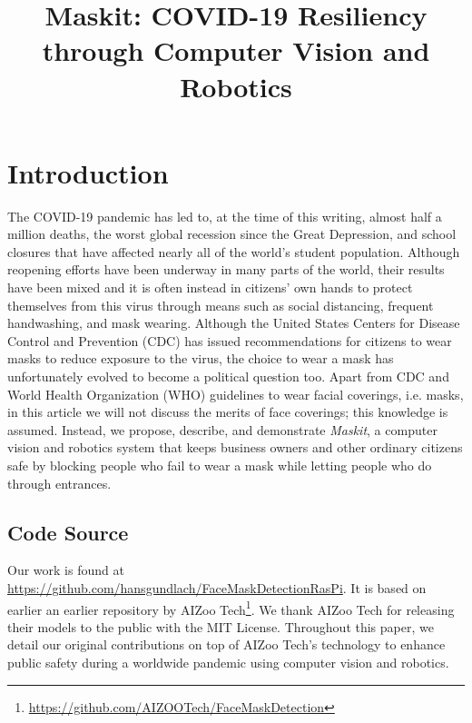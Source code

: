 \documentclass[conference, 12pt, onecolumn]{IEEEtran}
\date{}
\begin{document}
\title{Maskit: COVID-19 Resiliency through Computer Vision and Robotics}
\author{ 
\and
{}
}

\maketitle
\tableofcontents
\newpage

\section{Introduction}
The COVID-19 pandemic has led to, at the time of this writing, almost half a million deaths, the worst global recession since the Great Depression, and school closures that have affected nearly all of the world's student population. Although reopening efforts have been underway in many parts of the world, their results have been mixed and it is often instead in citizens' own hands to protect themselves from this virus through means such as social distancing, frequent handwashing, and mask wearing. Although the United States Centers for Disease Control and Prevention (CDC) has issued recommendations for citizens to wear masks to reduce exposure to the virus, the choice to wear a mask has unfortunately evolved to become a political question too\cite{brandon_2020, vigdor_2020}. Apart from CDC and World Health Organization (WHO) guidelines to wear facial coverings, i.e. masks, in this article we will not discuss the merits of face coverings; this knowledge is assumed. Instead, we propose, describe, and demonstrate \textit{Maskit}, a computer vision and robotics system that keeps business owners and other ordinary citizens safe by blocking people who fail to wear a mask while letting people who do through entrances.
\subsection{Code Source}
Our work is found at \url{https://github.com/hansgundlach/FaceMaskDetectionRasPi}. It is based on earlier an earlier repository by AIZoo Tech\footnote{\url{https://github.com/AIZOOTech/FaceMaskDetection}}. We thank AIZoo Tech for releasing their models to the public with the MIT License. Throughout this paper, we detail our original contributions on top of AIZoo Tech's technology to enhance public safety during a worldwide pandemic using computer vision and robotics.
\end{document}
